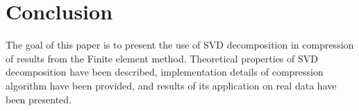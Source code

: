 \section{Conclusion}
\label{sec:conclusion}


The goal of this paper is to present the use of SVD decomposition in compression of results from the Finite element method. Theoretical properties of SVD decomposition have been described, implementation details of compression algorithm have been provided, and results of its application on real data have been presented.






